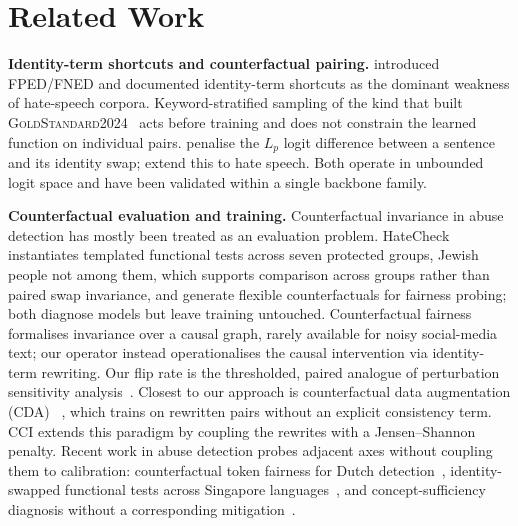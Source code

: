 \documentclass[11pt]{article}
\newcommand{\dataset}{\textsc{GoldStandard2024}\xspace}
\begin{document}
\section{Related Work}
\label{sec:related}

\textbf{Identity-term shortcuts and counterfactual pairing.} \citet{dixon2018measuring} introduced FPED/FNED and documented identity-term shortcuts as the dominant weakness of hate-speech corpora. Keyword-stratified sampling of the kind that built \dataset{}~\citep{jikeli2023antisemitic} acts before training and does not constrain the learned function on individual pairs. \citet{garg2019counterfactual} penalise the $L_p$ logit difference between a sentence and its identity swap; \citet{davani2021improving} extend this to hate speech. Both operate in unbounded logit space and have been validated within a single backbone family.

\textbf{Counterfactual evaluation and training.} Counterfactual invariance in abuse detection has mostly been treated as an evaluation problem. HateCheck~\citep{rottger2021hatecheck} instantiates templated functional tests across seven protected groups, Jewish people not among them, which supports comparison across groups rather than paired swap invariance, and \citet{fryer2022flexible} generate flexible counterfactuals for fairness probing; both diagnose models but leave training untouched. Counterfactual fairness~\citep{kusner2017counterfactual} formalises invariance over a causal graph, rarely available for noisy social-media text; our operator instead operationalises the causal intervention via identity-term rewriting. Our flip rate is the thresholded, paired analogue of perturbation sensitivity analysis~\citep{prabhakaran2019perturbation}. Closest to our approach is counterfactual data augmentation (CDA) ~\citep{lu2020gender,zmigrod2019counterfactual,kaushik2020learning}, which trains on rewritten pairs without an explicit consistency term. CCI extends this paradigm by coupling the rewrites with a Jensen--Shannon penalty. Recent work in abuse detection probes adjacent axes without coupling them to calibration: counterfactual token fairness for Dutch detection~\citep{bauer2025fairness}, identity-swapped functional tests across Singapore languages~\citep{ng2024sghatecheck}, and concept-sufficiency diagnosis without a corresponding mitigation~\citep{nejadgholi2023concept}.
\end{document}
